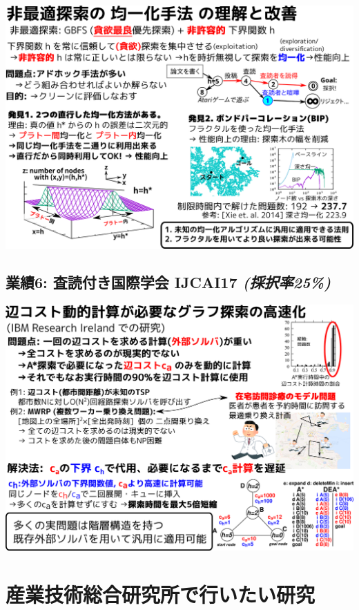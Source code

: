 \begin{resume}
\end{resume}

\includegraphics{img/icaps17.png}

\subsection{業績6: 査読付き国際学会 IJCAI17 \textbf{\emph{(採択率25\%)}}}
\label{sec-1-11}

\begin{resume}
\end{resume}

\includegraphics{img/ijcai17.png}


\section{産業技術総合研究所で行いたい研究}
\label{sec-2}

